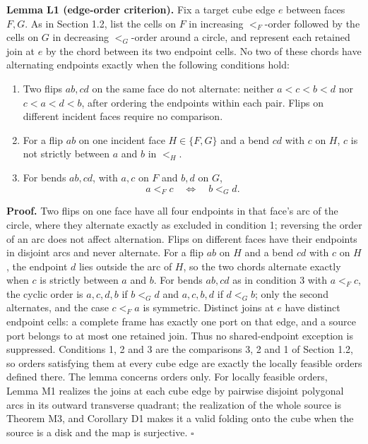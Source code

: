 \documentclass[
  11pt,
]{article}
\providecommand{\tightlist}{%
  \setlength{\itemsep}{0pt}\setlength{\parskip}{0pt}}
\begin{document}
\textbf{Lemma L1 (edge-order criterion).} Fix a target cube edge \(e\)
between faces \(F,G\). As in Section 1.2, list the cells on \(F\) in
increasing \(<_F\)-order followed by the cells on \(G\) in decreasing
\(<_G\)-order around a circle, and represent each retained join at \(e\)
by the chord between its two endpoint cells. No two of these chords have
alternating endpoints exactly when the following conditions hold:

\begin{enumerate}
\def\labelenumi{\arabic{enumi}.}
\tightlist
\item
  Two flips \(ab,cd\) on the same face do not alternate: neither
  \(a<c<b<d\) nor \(c<a<d<b\), after ordering the endpoints within each
  pair. Flips on different incident faces require no comparison.
\item
  For a flip \(ab\) on one incident face \(H\in\{F,G\}\) and a bend
  \(cd\) with \(c\) on \(H\), \(c\) is not strictly between \(a\) and
  \(b\) in \(<_H\).
\item
  For bends \(ab,cd\), with \(a,c\) on \(F\) and \(b,d\) on \(G\), \[
  a<_F c\quad\Longleftrightarrow\quad b<_G d.
  \]
\end{enumerate}

\textbf{Proof.} Two flips on one face have all four endpoints in that
face's arc of the circle, where they alternate exactly as excluded in
condition 1; reversing the order of an arc does not affect alternation.
Flips on different faces have their endpoints in disjoint arcs and never
alternate. For a flip \(ab\) on \(H\) and a bend \(cd\) with \(c\) on
\(H\), the endpoint \(d\) lies outside the arc of \(H\), so the two
chords alternate exactly when \(c\) is strictly between \(a\) and \(b\).
For bends \(ab,cd\) as in condition 3 with \(a<_F c\), the cyclic order
is \(a,c,d,b\) if \(b<_G d\) and \(a,c,b,d\) if \(d<_G b\); only the
second alternates, and the case \(c<_F a\) is symmetric. Distinct joins
at \(e\) have distinct endpoint cells: a complete frame has exactly one
port on that edge, and a source port belongs to at most one retained
join. Thus no shared-endpoint exception is suppressed. Conditions 1, 2
and 3 are the comparisons 3, 2 and 1 of Section 1.2, so orders
satisfying them at every cube edge are exactly the locally feasible
orders defined there. The lemma concerns orders only. For locally
feasible orders, Lemma M1 realizes the joins at each cube edge by
pairwise disjoint polygonal arcs in its outward transverse quadrant; the
realization of the whole source is Theorem M3, and Corollary D1 makes it
a valid folding onto the cube when the source is a disk and the map is
surjective. \(\square\)
\end{document}
